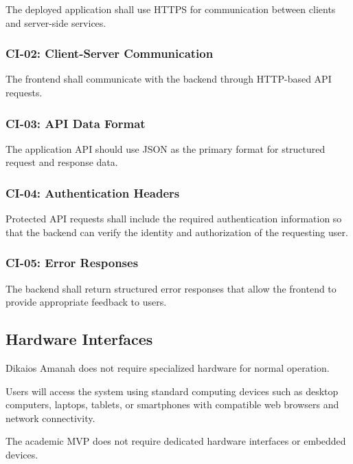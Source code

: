 The deployed application shall use HTTPS for communication between clients
and server-side services.

\subsubsection{CI-02: Client-Server Communication}

The frontend shall communicate with the backend through HTTP-based API
requests.

\subsubsection{CI-03: API Data Format}

The application API should use JSON as the primary format for structured
request and response data.

\subsubsection{CI-04: Authentication Headers}

Protected API requests shall include the required authentication
information so that the backend can verify the identity and authorization
of the requesting user.

\subsubsection{CI-05: Error Responses}

The backend shall return structured error responses that allow the
frontend to provide appropriate feedback to users.



\subsection{Hardware Interfaces}

Dikaios Amanah does not require specialized hardware for normal operation.

Users will access the system using standard computing devices such as
desktop computers, laptops, tablets, or smartphones with compatible web
browsers and network connectivity.

The academic MVP does not require dedicated hardware interfaces or
embedded devices.



